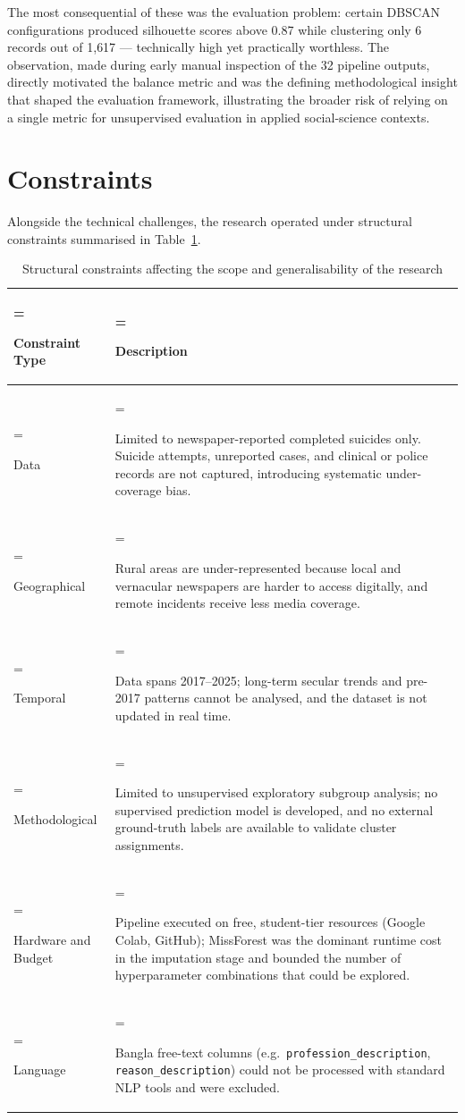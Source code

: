 The most consequential of these was the evaluation problem: certain DBSCAN configurations produced silhouette scores above 0.87 while clustering only 6 records out of 1{,}617 --- technically high yet practically worthless. The observation, made during early manual inspection of the 32 pipeline outputs, directly motivated the balance metric and was the defining methodological insight that shaped the evaluation framework, illustrating the broader risk of relying on a single metric for unsupervised evaluation in applied social-science contexts.

\section{Constraints}

Alongside the technical challenges, the research operated under structural constraints summarised in Table~\ref{tbl:structural_constraints_affecti}.

\begin{table}[H]
\centering
\caption[Structural constraints affecting scope and generalisability]{Structural constraints affecting the scope and generalisability of the research}
\label{tbl:structural_constraints_affecti}
\renewcommand{\arraystretch}{1.0}
\small
\begin{tabularx}{\textwidth}{|>{\hsize=0.447\hsize\linewidth=\hsize\raggedright\arraybackslash}X|>{\hsize=1.553\hsize\linewidth=\hsize\raggedright\arraybackslash}X|}
\hline
\textbf{Constraint Type} & \textbf{Description} \\ \hline
Data & Limited to newspaper-reported completed suicides only. Suicide attempts, unreported cases, and clinical or police records are not captured, introducing systematic under-coverage bias. \\ \hline
Geographical & Rural areas are under-represented because local and vernacular newspapers are harder to access digitally, and remote incidents receive less media coverage. \\ \hline
Temporal & Data spans 2017--2025; long-term secular trends and pre-2017 patterns cannot be analysed, and the dataset is not updated in real time. \\ \hline
Methodological & Limited to unsupervised exploratory subgroup analysis; no supervised prediction model is developed, and no external ground-truth labels are available to validate cluster assignments. \\ \hline
Hardware and Budget & Pipeline executed on free, student-tier resources (Google Colab, GitHub); MissForest was the dominant runtime cost in the imputation stage and bounded the number of hyperparameter combinations that could be explored. \\ \hline
Language & Bangla free-text columns (e.g.\ \texttt{profession\_description}, \texttt{reason\_description}) could not be processed with standard NLP tools and were excluded. \\ \hline
\end{tabularx}
\end{table}

